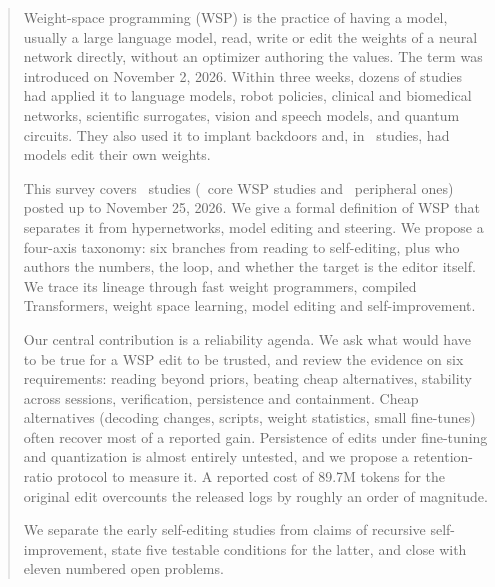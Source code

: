 \begin{abstract}
\noindent Weight-space programming (WSP) is the practice of having a model, usually a large language model, read, write or edit the weights of a neural network directly, without an optimizer authoring the values. The term was introduced on November 2, 2026. Within three weeks, dozens of studies had applied it to language models, robot policies, clinical and biomedical networks, scientific surrogates, vision and speech models, and quantum circuits. They also used it to implant backdoors and, in \nSelfEditing\ studies, had models edit their own weights.

This survey covers \nIncluded\ studies (\nCore\ core WSP studies and \nPeripheral\ peripheral ones) posted up to November 25, 2026. We give a formal definition of WSP that separates it from hypernetworks, model editing and steering. We propose a four-axis taxonomy: six branches from reading to self-editing, plus who authors the numbers, the loop, and whether the target is the editor itself. We trace its lineage through fast weight programmers, compiled Transformers, weight space learning, model editing and self-improvement.

Our central contribution is a reliability agenda. We ask what would have to be true for a WSP edit to be trusted, and review the evidence on six requirements: reading beyond priors, beating cheap alternatives, stability across sessions, verification, persistence and containment. Cheap alternatives (decoding changes, scripts, weight statistics, small fine-tunes) often recover most of a reported gain. Persistence of edits under fine-tuning and quantization is almost entirely untested, and we propose a retention-ratio protocol to measure it. A reported cost of 89.7M tokens for the original edit overcounts the released logs by roughly an order of magnitude.

We separate the early self-editing studies from claims of recursive self-improvement, state five testable conditions for the latter, and close with eleven numbered open problems.
\end{abstract}
